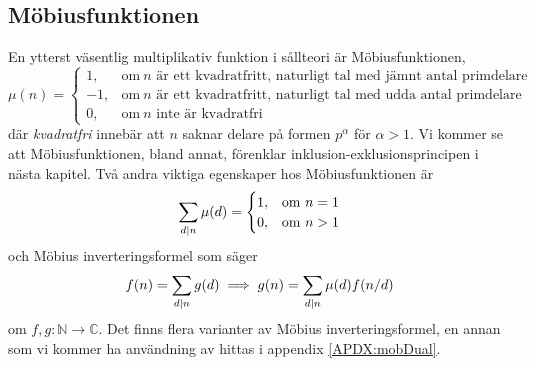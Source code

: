 \subsection{Möbiusfunktionen} \label{Mobius}
En ytterst väsentlig multiplikativ funktion i sållteori är Möbiusfunktionen,
\begin{equation*}
    \mu(n) = 
    \begin{cases}
        1, & \text{om}\ n \text{ är ett kvadratfritt, naturligt tal med jämnt antal primdelare}\\
        -1, & \text{om}\ n \text{ är ett kvadratfritt, naturligt tal med udda antal primdelare}\\
        0, & \text{om}\ n \text{ inte är kvadratfri}
    \end{cases}
\end{equation*}
där \textit{kvadratfri} innebär att $n$ saknar delare på formen \(p^\alpha\) för \(\alpha > 1\). Vi kommer se att Möbiusfunktionen, bland annat, förenklar inklusion-exklusionsprincipen i nästa kapitel. Två andra viktiga egenskaper hos Möbiusfunktionen är
\begin{equation*}
    \sum_{d \mid n} \mu(d) =
    \begin{cases}
        1, & \text{om}\ n = 1 \\
        0, & \text{om}\ n > 1
    \end{cases}
\end{equation*}
och Möbius inverteringsformel som säger
\begin{equation} \label{mobiusinv}
    f(n) = \sum_{d \mid n} g(d) \implies g(n) = \sum_{d \mid n} \mu(d) f(n/d)
\end{equation}
om \(f, g : \mathbb{N} \to \mathbb{C}\). Det finns flera varianter av Möbius inverteringsformel, en annan som vi kommer ha användning av hittas i appendix \ref{APDX:mobDual}.



